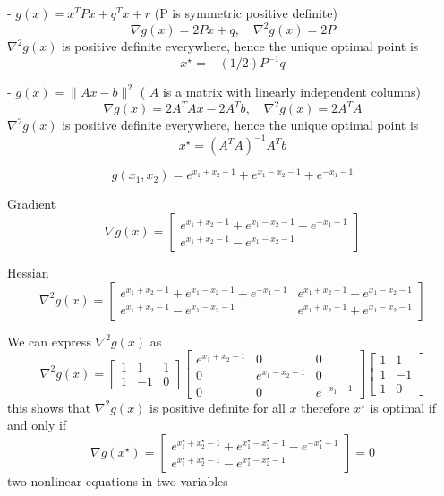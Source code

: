 \begin{example}
    - $ g(x)=x^{T} P x+q^{T} x+r $ (P is symmetric positive definite)
$$
\nabla g(x)=2 P x+q, \quad \nabla^{2} g(x)=2 P
$$
$ \nabla^{2} g(x) $ is positive definite everywhere, hence the unique optimal point is
$$
x^{\star}=-(1 / 2) P^{-1} q
$$
\end{example}

\begin{example}
    - $ g(x)=\|A x-b\|^{2} $ ( $ A $ is a matrix with linearly independent columns)
$$
\nabla g(x)=2 A^{T} A x-2 A^{T} b, \quad \nabla^{2} g(x)=2 A^{T} A
$$
$ \nabla^{2} g(x) $ is positive definite everywhere, hence the unique optimal point is
$$
x^{\star}=\left(A^{T} A\right)^{-1} A^{T} b
$$
\end{example}

\begin{example}
    $$ g\left(x_{1}, x_{2}\right)=e^{x_{1}+x_{2}-1}+e^{x_{1}-x_{2}-1}+e^{-x_{1}-1} $$

    Gradient
$$
\nabla g(x)=\left[\begin{array}{c}
e^{x_{1}+x_{2}-1}+e^{x_{1}-x_{2}-1}-e^{-x_{1}-1} \\
e^{x_{1}+x_{2}-1}-e^{x_{1}-x_{2}-1}
\end{array}\right]
$$

Hessian
$$
\nabla^{2} g(x)=\left[\begin{array}{cc}
e^{x_{1}+x_{2}-1}+e^{x_{1}-x_{2}-1}+e^{-x_{1}-1} & e^{x_{1}+x_{2}-1}-e^{x_{1}-x_{2}-1} \\
e^{x_{1}+x_{2}-1}-e^{x_{1}-x_{2}-1} & e^{x_{1}+x_{2}-1}+e^{x_{1}-x_{2}-1}
\end{array}\right]
$$


    We can express $ \nabla^{2} g(x) $ as
$$
\nabla^{2} g(x)=\left[\begin{array}{rrr}
1 & 1 & 1 \\
1 & -1 & 0
\end{array}\right]\left[\begin{array}{ccc}
e^{x_{1}+x_{2}-1} & 0 & 0 \\
0 & e^{x_{1}-x_{2}-1} & 0 \\
0 & 0 & e^{-x_{1}-1}
\end{array}\right]\left[\begin{array}{rr}
1 & 1 \\
1 & -1 \\
1 & 0
\end{array}\right]
$$
this shows that $ \nabla^{2} g(x) $ is positive definite for all $ x $
therefore $ x^{\star} $ is optimal if and only if
$$
\nabla g\left(x^{\star}\right)=\left[\begin{array}{c}
e^{x_{1}^{\star}+x_{2}^{\star}-1}+e^{x_{1}^{\star}-x_{2}^{\star}-1}-e^{-x_{1}^{\star}-1} \\
e^{x_{1}^{\star}+x_{2}^{\star}-1}-e^{x_{1}^{\star}-x_{2}^{\star}-1}
\end{array}\right]=0
$$
two nonlinear equations in two variables
\end{example}


